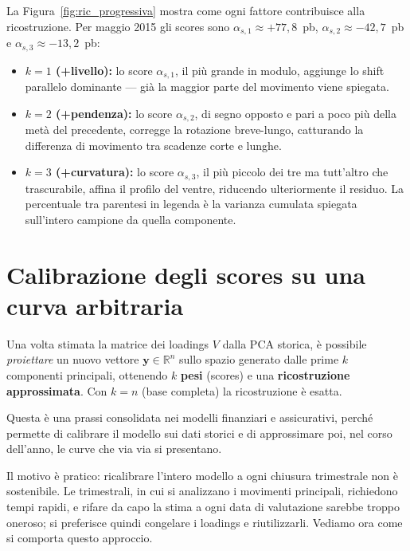 \documentclass[11pt,a4paper]{article}
\theoremstyle{plain}
\theoremstyle{definition}
\theoremstyle{remark}
\begin{document}
\noindent La Figura~\ref{fig:ric_progressiva} mostra come ogni fattore contribuisce alla
ricostruzione. Per maggio 2015 gli scores sono
$\alpha_{s,1}\approx +77{,}8$~pb, $\alpha_{s,2}\approx -42{,}7$~pb e
$\alpha_{s,3}\approx -13{,}2$~pb:
\begin{itemize}
  \item \textbf{$k=1$ (+livello):} lo score $\alpha_{s,1}$, il più grande in modulo,
aggiunge lo shift parallelo dominante --- già la maggior
parte del movimento viene spiegata.
  \item \textbf{$k=2$ (+pendenza):} lo score $\alpha_{s,2}$, di segno opposto e pari a
poco più della metà del precedente, corregge la rotazione breve-lungo,
catturando la differenza di movimento tra scadenze corte e lunghe.
  \item \textbf{$k=3$ (+curvatura):} lo score $\alpha_{s,3}$, il più piccolo dei tre ma
tutt'altro che trascurabile, affina il profilo del ventre, riducendo
ulteriormente il residuo. La percentuale tra parentesi in legenda è la varianza
cumulata spiegata sull'intero campione da quella componente.

\end{itemize}



\section{Calibrazione degli scores su una curva arbitraria}
\label{sec:calibrazione}

Una volta stimata la matrice dei loadings $V$ dalla PCA storica, è possibile
\emph{proiettare} un nuovo vettore $\mathbf{y} \in \mathbb{R}^n$ sullo spazio
generato dalle prime $k$ componenti principali, ottenendo $k$ \textbf{pesi}
(scores) e una \textbf{ricostruzione approssimata}. Con $k = n$ (base completa)
la ricostruzione è esatta.

Questa è una prassi consolidata nei modelli finanziari e assicurativi, perché
permette di calibrare il modello sui dati storici e di approssimare poi, nel
corso dell'anno, le curve che via via si presentano.

Il motivo è pratico: ricalibrare l'intero modello a ogni chiusura trimestrale
non è sostenibile. Le trimestrali, in cui si analizzano i movimenti
principali, richiedono tempi rapidi, e rifare da capo la stima a ogni data di
valutazione sarebbe troppo oneroso; si preferisce quindi congelare i loadings
e riutilizzarli. Vediamo ora come si comporta questo approccio.
\end{document}
